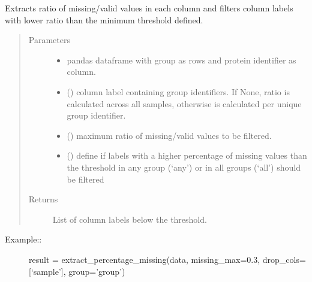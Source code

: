 \documentclass[letterpaper,10pt,english]{sphinxmanual}
\begin{document}

\begin{fulllineitems}
\label{\detokenize{_autosummary/analytics_core.analytics:analytics_core.analytics.analytics.extract_percentage_missing}}
Extracts ratio of missing/valid values in each column and filters column labels with lower ratio than the minimum threshold defined.
\begin{quote}\begin{description}
\item[{Parameters}] \leavevmode\begin{itemize}
\item {} 
 \textendash{} pandas dataframe with group as rows and protein identifier as column.

\item {} 
 () \textendash{} column label containing group identifiers. If None, ratio is calculated across all samples, otherwise is calculated per unique group identifier.

\item {} 
 () \textendash{} maximum ratio of missing/valid values to be filtered.

\item {} 
 () \textendash{} define if labels with a higher percentage of missing values than the threshold in any group (‘any’) or in all groups (‘all’) should be filtered

\end{itemize}

\item[{Returns}] \leavevmode
List of column labels below the threshold.

\end{description}\end{quote}
\begin{description}
\item[{Example::}] \leavevmode
result = extract\_percentage\_missing(data, missing\_max=0.3, drop\_cols={[}‘sample’{]}, group=’group’)

\end{description}

\end{fulllineitems}
\end{document}

